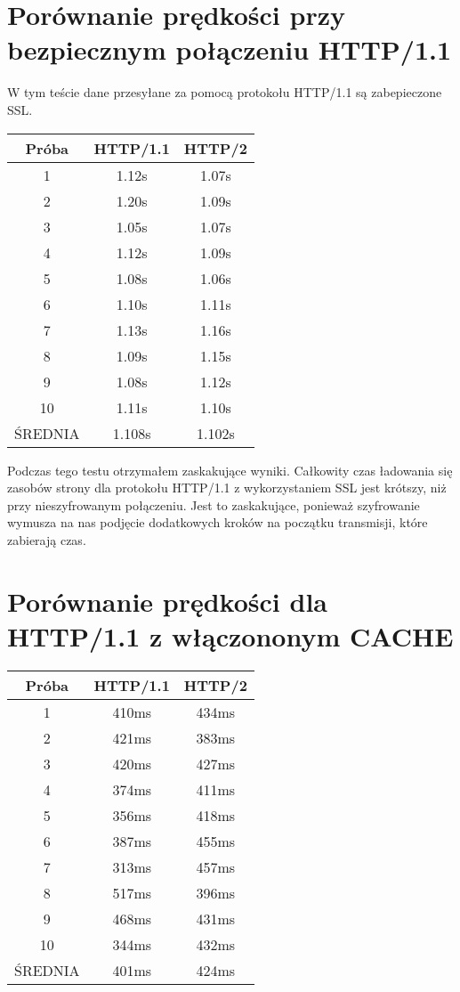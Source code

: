 \documentclass[a4paper,12pt,twoside,openany]{report}
\begin{document}
\section{Porównanie prędkości przy bezpiecznym połączeniu HTTP/1.1}

W tym teście dane przesyłane za pomocą protokołu HTTP/1.1 są zabepieczone SSL.

\begin{tabular}{c|c|c}
Próba & HTTP/1.1 & HTTP/2 \\ \hline
1 & 1.12s & 1.07s \\
2 & 1.20s & 1.09s \\
3 & 1.05s & 1.07s \\
4 & 1.12s & 1.09s \\
5 & 1.08s & 1.06s \\
6 & 1.10s & 1.11s \\
7 & 1.13s & 1.16s \\
8 & 1.09s & 1.15s \\
9 & 1.08s & 1.12s \\
10 & 1.11s & 1.10s\\ \hline
ŚREDNIA & 1.108s & 1.102s \\
\end{tabular}

Podczas tego testu otrzymałem zaskakujące wyniki.
Całkowity czas ładowania się zasobów strony dla protokołu HTTP/1.1 z wykorzystaniem SSL jest krótszy, niż przy nieszyfrowanym połączeniu.
Jest to zaskakujące, ponieważ szyfrowanie wymusza na nas podjęcie dodatkowych kroków na początku transmisji, które zabierają czas.


\section{Porównanie prędkości dla HTTP/1.1 z włączononym CACHE}

\begin{tabular}{c|c|c}
Próba & HTTP/1.1 & HTTP/2 \\ \hline
1 & 410ms & 434ms \\
2 & 421ms & 383ms \\
3 & 420ms & 427ms \\
4 & 374ms & 411ms \\
5 & 356ms & 418ms \\
6 & 387ms & 455ms \\
7 & 313ms & 457ms \\
8 & 517ms & 396ms \\
9 & 468ms & 431ms \\
10 & 344ms & 432ms \\ \hline
ŚREDNIA & 401ms & 424ms \\
\end{tabular}
\end{document}
